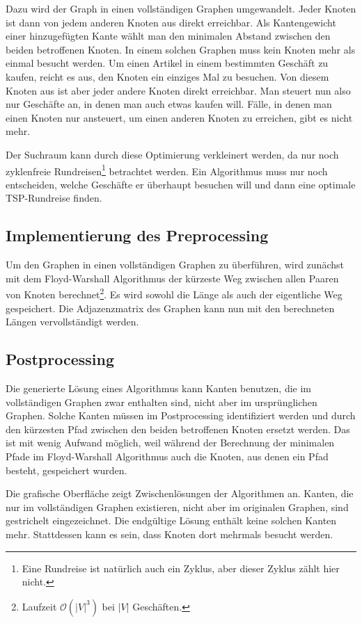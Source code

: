 Dazu wird der Graph in einen vollständigen Graphen umgewandelt. Jeder Knoten ist dann von jedem anderen Knoten aus direkt erreichbar. Als Kantengewicht einer hinzugefügten Kante wählt man den minimalen Abstand zwischen den beiden betroffenen Knoten. In einem solchen Graphen muss kein Knoten mehr als einmal besucht werden. Um einen Artikel in einem bestimmten Geschäft zu kaufen, reicht es aus, den Knoten ein einziges Mal zu besuchen. Von diesem Knoten aus ist aber jeder andere Knoten direkt erreichbar. Man steuert nun also nur Geschäfte an, in denen man auch etwas kaufen will. Fälle, in denen man einen Knoten nur ansteuert, um einen anderen Knoten zu erreichen, gibt es nicht mehr. 

Der Suchraum kann durch diese Optimierung verkleinert werden, da nur noch zyklenfreie Rundreisen\footnote{Eine Rundreise ist natürlich auch ein Zyklus, aber dieser Zyklus zählt hier nicht.} betrachtet werden. Ein Algorithmus muss nur noch entscheiden, welche Geschäfte er überhaupt besuchen will und dann eine optimale TSP-Rundreise finden.

\subsection{Implementierung des Preprocessing}
Um den Graphen in einen vollständigen Graphen zu überführen, wird zunächst mit dem Floyd-Warshall Algorithmus der kürzeste Weg zwischen allen Paaren von Knoten berechnet\footnote{Laufzeit $\mathcal{O}(|V|^3)$ bei $|V|$ Geschäften.}. Es wird sowohl die Länge als auch der eigentliche Weg gespeichert. Die Adjazenzmatrix des Graphen kann nun mit den berechneten Längen vervollständigt werden. 

\subsection{Postprocessing}
Die generierte Lösung eines Algorithmus kann Kanten benutzen, die im vollständigen Graphen zwar enthalten sind, nicht aber im ursprünglichen Graphen. Solche Kanten müssen im Postprocessing identifiziert werden und durch den kürzesten Pfad zwischen den beiden betroffenen Knoten ersetzt werden. Das ist mit wenig Aufwand möglich, weil während der Berechnung der minimalen Pfade im Floyd-Warshall Algorithmus auch die Knoten, aus denen ein Pfad besteht, gespeichert wurden. 

Die grafische Oberfläche zeigt Zwischenlösungen der Algorithmen an. Kanten, die nur im vollständigen Graphen existieren, nicht aber im originalen Graphen, sind gestrichelt eingezeichnet. Die endgültige Lösung enthält keine solchen Kanten mehr. Stattdessen kann es sein, dass Knoten dort mehrmals besucht werden.
